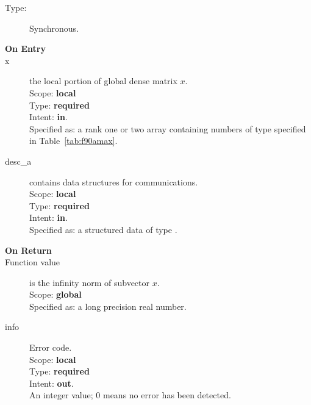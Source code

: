 \begin{description}
\item[Type:] Synchronous.
\item[\bf On Entry]
\item[x] the local portion of global dense matrix
$x$. %
\\
Scope: {\bf local} \\
Type: {\bf required} \\
Intent: {\bf in}.\\
Specified as:  a rank one or two array  
containing numbers of type specified in
Table~\ref{tab:f90amax}.
\item[desc\_a] contains data structures for communications.\\
Scope: {\bf local} \\
Type: {\bf required}\\
Intent: {\bf in}.\\
Specified as: a structured data of type \descdata.

\item[\bf On Return] 
\item[Function value] is the infinity norm of subvector $x$.\\
Scope: {\bf global} \\
Specified as: a long precision real number.
\item[info] Error code.\\
Scope: {\bf local} \\
Type: {\bf required} \\
Intent: {\bf out}.\\
An integer value; 0 means no error has been detected. 
\end{description}
%
%


